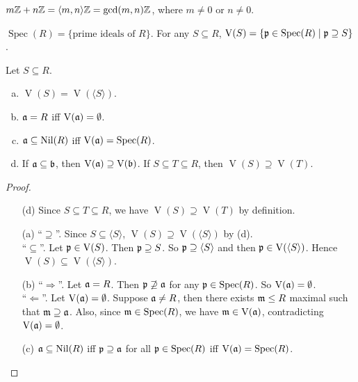 \begin{example*}
    $m\mathbb{Z} + n\mathbb{Z} = \langle m,n \rangle\mathbb{Z} = \operatorname{gcd}(m,n)\mathbb{Z}$, where $m \neq 0$ or $n \neq 0$.
\end{example*}

\begin{recall*}
    $\operatorname{Spec}(R) = \{\text{prime ideals of $R$}\}$. For any $S \subseteq R$, $\operatorname{V}(S) = \{\mathfrak{p} \in \operatorname{Spec}(R) \mid \mathfrak{p} \supseteq S\}$.
\end{recall*}

\begin{proposition}
    Let $S \subseteq R$.
    \begin{enumerate}[(a)]
        \item $\operatorname{V}(S) = \operatorname{V}(\langle S \rangle)$. 
        \item $\mathfrak{a} = R$ iff $\operatorname{V}(\mathfrak{a}) = \emptyset$.
        \item $\mathfrak{a} \subseteq \operatorname{Nil}(R)$ iff $\operatorname{V}(\mathfrak{a}) = \operatorname{Spec}(R)$.
        \item If $\mathfrak{a} \subseteq \mathfrak{b}$, then $\operatorname{V}(\mathfrak{a}) \supseteq \operatorname{V}(\mathfrak{b})$. If $S \subseteq T \subseteq R$, then $\operatorname{V}(S) \supseteq \operatorname{V}(T)$.
    \end{enumerate}
\end{proposition}

\begin{proof}
    \begin{enumerate} 
        \item [(d)] Since $S \subseteq T \subseteq R$, we have $\operatorname{V}(S) \supseteq \operatorname{V}(T)$ by definition.
        \item [(a)]
            ``$\supseteq$''. Since $S \subseteq \langle S \rangle$, $\operatorname{V}(S) \supseteq \operatorname{V}(\langle S \rangle)$ by (d). \\ 
            ``$\subseteq$''. Let $\mathfrak{p} \in \operatorname{V}(S)$. Then $\mathfrak{p} \supseteq S$. So $\mathfrak{p} \supseteq \langle S \rangle$ and then $\mathfrak{p} \in \operatorname{V}(\langle S \rangle)$. Hence $\operatorname{V}(S) \subseteq \operatorname{V}(\langle S \rangle)$.
        \item [(b)]
            ``$\Rightarrow$''. Let $\mathfrak{a} = R$. Then $\mathfrak{p} \not \supseteq \mathfrak{a}$ for any $\mathfrak{p} \in \operatorname{Spec}(R)$. So $\operatorname{V}(\mathfrak{a}) = \emptyset$. \\
            ``$\Leftarrow$''. Let $\operatorname{V}(\mathfrak{a}) = \emptyset$. Suppose $\mathfrak{a} \neq R$, then there exists $\mathfrak{m} \leq R$ maximal such that $\mathfrak{m} \supseteq \mathfrak{a}$. Also, since $\mathfrak{m} \in \operatorname{Spec}(R)$, we have $\mathfrak{m} \in \operatorname{V}(\mathfrak{a})$, contradicting $\operatorname{V}(\mathfrak{a}) = \emptyset$.
        \item[(c)] $\mathfrak{a} \subseteq \operatorname{Nil}(R)$ iff $\mathfrak{p} \supseteq \mathfrak{a}$ for all $\mathfrak{p} \in \operatorname{Spec}(R)$ iff $\operatorname{V}(\mathfrak{a}) = \operatorname{Spec}(R)$.
    \end{enumerate}
\end{proof}

